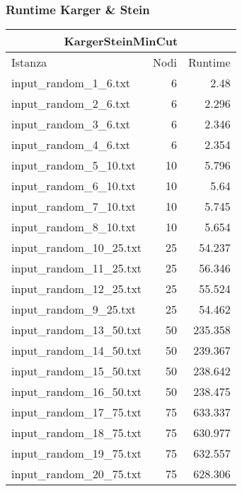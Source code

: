 \subsubsection{Runtime Karger \& Stein}

\begin{table}[H]
    \centering

    \begin{tabular}{lrr}
     \hline
     \multicolumn{3}{c}{KargerSteinMinCut} \\
     \hline
     Istanza                    &   Nodi &       Runtime \\
     \hline
     input\_random\_1\_6.txt    &       6 &      2.48    \\
     input\_random\_2\_6.txt    &       6 &     2.296    \\
     input\_random\_3\_6.txt    &       6 &     2.346    \\
     input\_random\_4\_6.txt    &       6 &     2.354    \\
     input\_random\_5\_10.txt   &      10 &     5.796    \\
     input\_random\_6\_10.txt   &      10 &      5.64    \\
     input\_random\_7\_10.txt   &      10 &     5.745    \\
     input\_random\_8\_10.txt   &      10 &     5.654    \\
     input\_random\_10\_25.txt  &      25 &     54.237   \\
     input\_random\_11\_25.txt  &      25 &     56.346   \\
     input\_random\_12\_25.txt  &      25 &     55.524   \\
     input\_random\_9\_25.txt   &      25 &     54.462   \\
     input\_random\_13\_50.txt  &      50 &    235.358   \\
     input\_random\_14\_50.txt  &      50 &    239.367   \\
     input\_random\_15\_50.txt  &      50 &    238.642   \\
     input\_random\_16\_50.txt  &      50 &    238.475   \\
     input\_random\_17\_75.txt  &      75 &    633.337   \\
     input\_random\_18\_75.txt  &      75 &    630.977   \\
     input\_random\_19\_75.txt  &      75 &    632.557   \\
     input\_random\_20\_75.txt  &      75 &    628.306   \\

\end{tabular}
\end{table}
